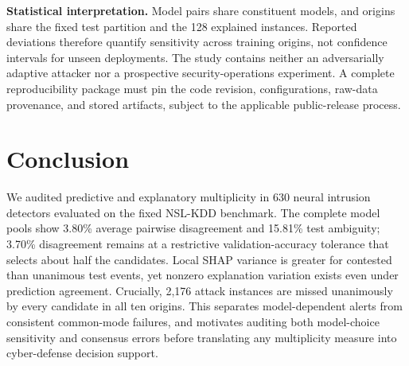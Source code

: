 \documentclass[10pt,conference]{IEEEtran}
\begin{document}
\textbf{Statistical interpretation.} Model pairs share constituent models, and origins share the fixed test partition and the 128 explained instances. Reported deviations therefore quantify sensitivity across training origins, not confidence intervals for unseen deployments. The study contains neither an adversarially adaptive attacker nor a prospective security-operations experiment. A complete reproducibility package must pin the code revision, configurations, raw-data provenance, and stored artifacts, subject to the applicable public-release process.

\section{Conclusion}
We audited predictive and explanatory multiplicity in 630 neural intrusion detectors evaluated on the fixed NSL-KDD benchmark. The complete model pools show 3.80\% average pairwise disagreement and 15.81\% test ambiguity; 3.70\% disagreement remains at a restrictive validation-accuracy tolerance that selects about half the candidates. Local SHAP variance is greater for contested than unanimous test events, yet nonzero explanation variation exists even under prediction agreement. Crucially, 2,176 attack instances are missed unanimously by every candidate in all ten origins. This separates model-dependent alerts from consistent common-mode failures, and motivates auditing both model-choice sensitivity and consensus errors before translating any multiplicity measure into cyber-defense decision support.

\end{document}
